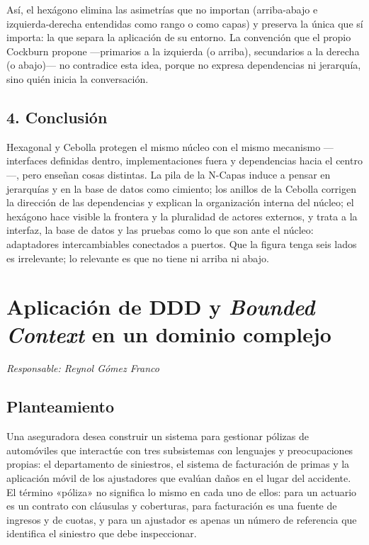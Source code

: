 \documentclass[11pt,a4paper]{article}
\newcommand{\responsable}[1]{\noindent\textit{Responsable: #1}\par\medskip}
\begin{document}
Así, el hexágono elimina las asimetrías que no importan (arriba-abajo e izquierda-derecha
entendidas como rango o como capas) y preserva la única que sí importa: la que separa la
aplicación de su entorno. La convención que el propio Cockburn propone ---primarios a la
izquierda (o arriba), secundarios a la derecha (o abajo)--- no contradice esta idea, porque no
expresa dependencias ni jerarquía, sino quién inicia la conversación.

\subsection*{4. Conclusión}

Hexagonal y Cebolla protegen el mismo núcleo con el mismo mecanismo ---interfaces definidas
dentro, implementaciones fuera y dependencias hacia el centro---, pero enseñan cosas
distintas. La pila de la N-Capas induce a pensar en jerarquías y en la base de datos como
cimiento; los anillos de la Cebolla corrigen la dirección de las dependencias y explican la
organización interna del núcleo; el hexágono hace visible la frontera y la pluralidad de
actores externos, y trata a la interfaz, la base de datos y las pruebas como lo que son ante
el núcleo: adaptadores intercambiables conectados a puertos. Que la figura tenga seis lados es
irrelevante; lo relevante es que no tiene ni arriba ni abajo.

\newpage
\section{Aplicación de DDD y \emph{Bounded Context} en un dominio complejo}
\responsable{Reynol Gómez Franco}

\subsection*{Planteamiento}

Una aseguradora desea construir un sistema para gestionar pólizas de automóviles que
interactúe con tres subsistemas con lenguajes y preocupaciones propias: el departamento
de siniestros, el sistema de facturación de primas y la aplicación móvil de los ajustadores
que evalúan daños en el lugar del accidente. El término «póliza» no significa lo mismo en
cada uno de ellos: para un actuario es un contrato con cláusulas y coberturas, para
facturación es una fuente de ingresos y de cuotas, y para un ajustador es apenas un número
de referencia que identifica el siniestro que debe inspeccionar.
\end{document}

